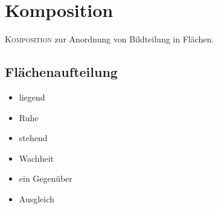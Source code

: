 \newcommand{\scale}{2}
\section{Komposition}
\lettrine{K}{omposition} zur Anordnung von Bildteilung in Flächen.

\subsection{Flächenaufteilung}
\begin{multicols}{2}
\begin{minipage}{3cm}
\end{minipage}
\begin{minipage}{5cm}
\begin{itemize}
	\item liegend
	\item Ruhe
\end{itemize}
\end{minipage}

\vspace{0.2cm}

\begin{minipage}{2.3cm}
\end{minipage}
\begin{minipage}{5cm}
\begin{itemize}
	\item stehend
	\item Wachheit
	\item ein Gegenüber
\end{itemize}
\end{minipage}

\vspace{0.2cm}

\begin{minipage}{2.3cm}
\end{minipage}
\begin{minipage}{5cm}
\begin{itemize}
	\item Ausgleich
\end{itemize}
\end{minipage}


\end{multicols}
